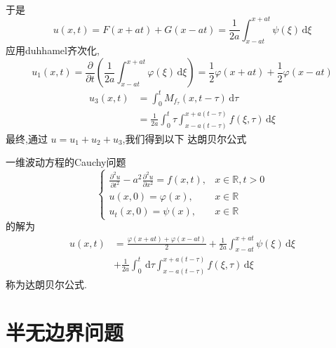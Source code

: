 \documentclass[../../PDE.tex]{subfiles}
\begin{document}
\[\begin{aligned}
\end{aligned}
\]于是 \[
u\left( x,t \right) = F\left( x+ at \right)+ G\left( x-at \right)= \frac{1 }{2a }\int_{x-at}^{x+ at}\psi \left(  \xi \right)\,\mathrm{d}  \xi    
\]应用duhhamel齐次化, \[
u_1\left( x,t \right)= \frac{\partial }{\partial t} \left( \frac{1 }{2a }\int_{x-at}^{x+ at} \varphi \left(  \xi  \right)   \,\mathrm{d}  \xi \right)=   \frac{1}{2}  \varphi \left( x+ at \right)+ \frac{1}{2} \varphi \left( x- at \right)  
\] \[
\begin{aligned}
    u_3\left( x,t \right)&=  \int_{0}^{t}M_{f_{\tau }}\left( x,t-\tau  \right)\,\mathrm{d} \tau   \\ 
     & = \frac{1 }{2a } \int_{0}^{t} \tau \int_{x-a\left( t- \tau  \right) }^{x+ a\left( t-\tau  \right) }f\left(  \xi ,\tau  \right) \,\mathrm{d}  \xi 
\end{aligned}
\]
最终,通过 \(  u= u_1+ u_2+ u_3  \),我们得到以下 达朗贝尔公式 

\begin{theorem}
    一维波动方程的Cauchy问题 \[
    \begin{cases} \frac{\partial ^{2}u  }{\partial t^{2}}-a^{2} \frac{\partial ^{2}u}{\partial x^{2}}= f\left( x,t \right) ,& x \in \mathbb{R} ,t> 0\\ 
     u\left( x,0 \right)=  \varphi \left( x \right),& x \in \mathbb{R}\\ 
      u_{t}\left( x,0 \right)= \psi \left( x \right),& x \in \mathbb{R}     \end{cases} 
    \]的解为 \[
    \begin{aligned}
    u\left( x,t \right)& =  \frac{ \varphi \left( x+ at \right)+  \varphi \left( x-at \right)   }{2 }   +  \frac{1 }{2a } \int_{x-at}^{x+ at}\psi \left(  \xi  \right)\,\mathrm{d}  \xi \\ 
     & + \frac{1 }{2a }\int_{0}^{t}\,\mathrm{d} \tau \int_{x-a\left( t-\tau  \right) }^{x+ a\left( t-\tau  \right) }f\left(  \xi ,\tau  \right)\,\mathrm{d}  \xi     
    \end{aligned}
    \]称为达朗贝尔公式.
\end{theorem}


\section{半无边界问题}
\end{document}
